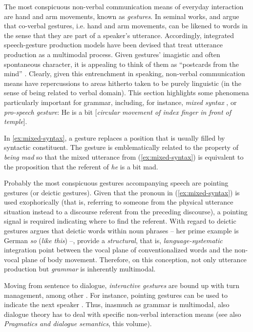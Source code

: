 \documentclass[output=paper]{langsci/langscibook}
\begin{document}
The most conspicuous non-verbal communication means of everyday interaction are hand and arm movements, known as \emph{gestures}.
%
In seminal works, \citet{McNeill:1985,McNeill:1992} and \citet{Kendon:1980,Kendon:2004} argue that co-verbal gestures, i.e. hand and arm movements, can be likened to words in the sense that they are part of a speaker's utterance.
%
Accordingly, integrated speech-gesture production models have been devised \citep{Kita:Ozyurek:2003,de:Ruiter:2000,Krauss:Chen:Gottesmann:2000} that treat utterance production as a multimodal process.
%
Given gestures' imagistic and often spontaneous character, it is appealing to think of them as \enquote{postcards from the mind} \citep{de:Ruiter:2007:a}.
%
Clearly, given this entrenchment in speaking, non-verbal communication means have repercussions to areas hitherto taken to be purely linguistic (in the sense of being related to verbal domain).
%
This section highlights some phenomena particularly important for grammar, including, for instance,  \emph{mixed syntax}  \citep{Slama-Cazacu:1976}, or \emph{pro-speech gesture}: 
%
\ea \label{ex:mixed-syntax}
He is a bit [\textit{circular movement of index finger in front of temple}].
\z

In \ref{ex:mixed-syntax}, a gesture replaces a position that is usually filled by syntactic constituent.
%
The gesture is emblematically related to the property of \textit{being mad} so that the mixed utterance from (\ref{ex:mixed-syntax}) is equivalent to the proposition that the referent of \textit{he} is a bit mad.

Probably the most conspicuous gestures accompanying speech are pointing gestures (or deictic gestures).
%
Given that the pronoun in (\ref{ex:mixed-syntax}) is used exophorically (that is, referring to someone from the physical utterance situation instead to a discourse referent from the preceding discourse), a pointing signal is required indicating where to find the referent. 
%
With regard to deictic gestures \citet{Fricke:2012} argues that deictic words  within noun phrases -- her prime example is German \textit{so} (\textit{like this}) --, provide a \emph{structural}, that is, \emph{language-systematic} integration point between the vocal plane of conventionalized words and the non-vocal plane of body movement.
%
Therefore, on this conception, not only utterance production but \emph{grammar} is inherently multimodal.

Moving from sentence to dialogue, \emph{interactive gestures}  are bound up with turn management, among other \citep{Bavelas:Chovil:Lawrie:Wade:1992,Bavelas:Chovil:Coates:Roe:1995}.
%
For instance, pointing gestures can be used to indicate the next speaker \citep{Rieser:Poesio:2009}. 
%
Thus, inasmuch as grammar is multimodal, also dialogue theory has to deal with specific non-verbal interaction means (see also \textit{Pragmatics and dialogue semantics}, this volume).
\end{document}
